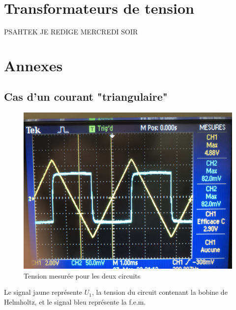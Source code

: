 \documentclass[11pt]{article}
\begin{document}
\break
\section{Transformateurs de tension}
PSAHTEK JE REDIGE MERCREDI SOIR


\break
\section*{Annexes}
\subsection{Cas d'un courant "triangulaire"}
\begin{figure}[h!]
  \centering
  \includegraphics[width=.5\linewidth]{img/oscillo.png}
  \caption{Tension mesurée pour les deux circuits}
  \label{fig:oscillo}
\end{figure}

Le signal jaune représente $U_1$, la tension du circuit contenant la bobine de Helmholtz, et le signal bleu représente la f.e.m.
\end{document}
